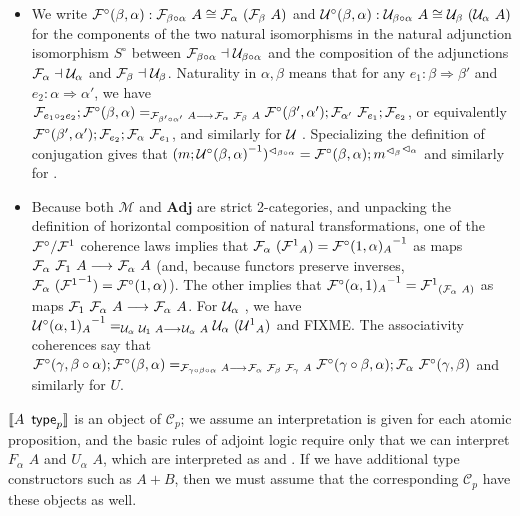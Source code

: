 \documentclass{drl-common/llncs}
\renewcommand{\sem}[1]{\ensuremath{ \llbracket #1 \rrbracket}}
\newcommand{\inv}[1]{\ensuremath{{#1}^{-1}}}
\newcommand{\C}{\ensuremath{\mathcal{C}}}
\newcommand{\M}{\ensuremath{\mathcal{M}}}
\newcommand{\la}{\ensuremath{\dashv}}
\newcommand{\arrow}[3]{\ensuremath{#2 \longrightarrow_{#1} #3}}
\newcommand{\tc}[2]{\ensuremath{#1 \Rightarrow #2}}
\newcommand{\Adj}{\textbf{Adj}}
\newcommand\compo[2]{\ensuremath{#1 \circ #2}}
\newcommand\comph[2]{\ensuremath{#1 \mathbin{\circ_2} #2}}
\renewcommand\wftp[2]{\ensuremath{#1 \,\,\, \dsd{type}_{#2}}}
\newcommand\F[2]{\ensuremath{F_{#1} \,\, #2}}
\newcommand\U[2]{\ensuremath{U_{#1} \,\, #2}}
\newcommand\coprd[2]{\ensuremath{#1 + #2}}
\begin{document}
\begin{itemize}
\item We write $\semFcomp(\beta,\alpha) : \semF{\compo{\beta}{\alpha}}{A} \iso
  \semF{\alpha}{(\semF \beta A)}$ and $\semUcomp(\beta,\alpha) :
  \semU{\compo{\beta}{\alpha}}{A} \iso \semU{\beta}{(\semU{\alpha}{A})}$
  for the components of the two natural isomorphisms in the 
  natural adjunction isomorphism $S^\circ$ between $\semFo{\compo{\beta}{\alpha}}
  \la \semUo{\compo{\beta}{\alpha}}$ and the composition of the
  adjunctions $\semFo{\alpha} \la \semUo{\alpha}$ and
  $\semFo{\beta} \la \semUo{\beta}$.  
  Naturality in $\alpha,\beta$ means that 
  for any 
  $e_1 : \tc{\beta}{\beta'}$ and $e_2 : \tc{\alpha}{\alpha'}$, 
  we have
  $ \semFo{\comph{e_1}{e_2}};\semFcomp(\beta,\alpha) =_{\arrow{}{\semF{\compo{\beta'}{\alpha'}}{A}}{\semF{\alpha}{\semF{\beta}{A}}}}
  \semFcomp(\beta',\alpha');\semF{\alpha'}{\semFo{e_1}};{\semFo{e_2}}$,
  or equivalently 
  $\mathcal{F}^\circ(\beta',\alpha');{{\mathcal{F}_{e_2}}};\mathcal{F}_{\alpha} \,\, {\mathcal{F}_{e_1}}$,
  and similarly for $\mathcal{U}_{} \,\, $.
  Specializing the definition of conjugation gives that 
  $\semrtol{(m;\inv{\semUcomp(\beta,\alpha)})}{\compo{\beta}{\alpha}} = \semFcomp(\beta,\alpha);\semrtol{{\semrtol{m}{\beta}}}{\alpha}$
  and similarly for \semltor{-}{}.  


\item Because both $\M$ and $\Adj$ are strict 2-categories, and
  unpacking the definition of horizontal composition of natural
  transformations, one of the $\mathcal{F}^\circ/{\mathcal{F}^1}$ coherence laws
  implies that $\semF{\alpha}{(\semFone_A)} = \inv{\semFcomp(1,\alpha)_A}$
  as maps ${\arrow{}{\semF{\alpha}{\semF{1}{A}}}{\semF{\alpha}{A}}}$
  (and, because functors preserve inverses,
  $\semF{\alpha}{(\inv{\semFone})} = {\semFcomp(1,\alpha)}$).  The other
  implies that $\inv{\semFcomp(\alpha,1)_{A}} =
  \semFone_{(\semF{\alpha}{A})}$  as maps
  $\arrow{}{\semF{1}{\semF{\alpha}{A}}}{\semF{\alpha}{A}}$.  
   For $\mathcal{U}_{\alpha} \,\, $, we have
  $\inv{\semUcomp(\alpha,1)_A} =_{\arrow{}{\semU{\alpha}{\semU{1}{A}}}{\semU{\alpha}{A}}} \semU{\alpha}{(\semUone_A)}$
  and FIXME.
  The associativity coherences say that
  $\semFcomp(\gamma,\compo{\beta}{\alpha});\semFcomp(\beta,\alpha)
  =_{\arrow{}{\semF{\compo{\gamma}{\compo{\beta}{\alpha}}}{A}}{\semF{\alpha}{\semF{\beta}{\semF{\gamma}{A}}}}}
  \semFcomp(\compo{\gamma}{\beta},\alpha);\semF{\alpha}{\semFcomp(\gamma,\beta)}$
  and similarly for $U$.  

\end{itemize}

\sem{\wftp{A}{p}} is an object of $\C_p$; we assume an interpretation is
given for each atomic proposition, and the basic rules of adjoint logic
require only that we can interpret \F{\alpha}{A} and \U{\alpha}{A},
which are interpreted as \semF{\alpha}{\sem{A}} and
\semU{\alpha}{\sem{A}}. If we have additional type constructors such as
\coprd{A}{B}, then we must assume that the corresponding $\C_p$ have
these objects as well.  
\end{document}
